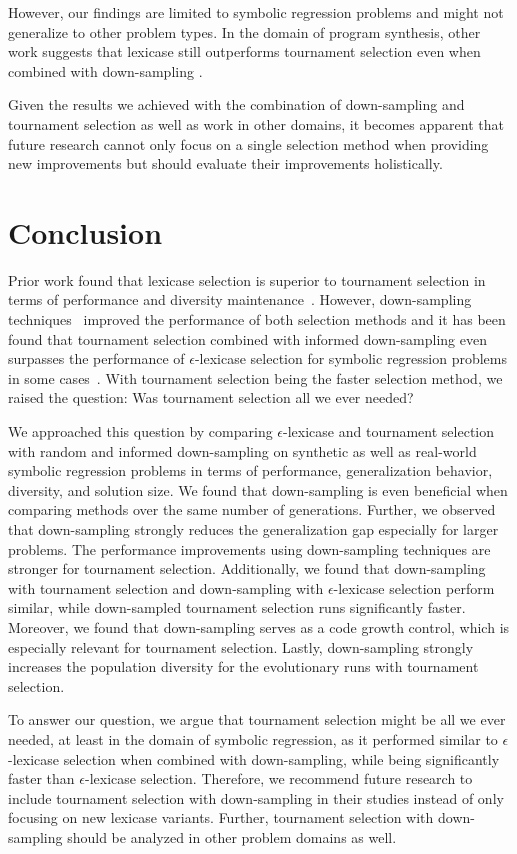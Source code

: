\documentclass[runningheads]{llncs}
\begin{document}
However, our findings are limited to symbolic regression problems and might not generalize to other problem types. In the domain of program synthesis, other work suggests that lexicase still outperforms tournament selection even when combined with down-sampling \cite{boldi2024untangling}.

Given the results we achieved with the combination of down-sampling and tournament selection as well as work in other domains, it becomes apparent that future research cannot only focus on a single selection method when providing new improvements but should evaluate their improvements holistically. 


\section{Conclusion}
\label{sec:conclusion}

Prior work found that lexicase selection is superior to tournament selection in terms of performance and diversity maintenance~\cite{Helmuth.2014,Helmuth.2015, LaCava.2016}. However, down-sampling techniques~\cite{Goncalves.2012,boldi2024informed} improved the performance of both selection methods and it has been found that tournament selection combined with informed down-sampling even surpasses the performance of $\epsilon$-lexicase selection for symbolic regression problems in some cases~\cite{geiger2024lexicase}. With tournament selection being the faster selection method, we raised the question: Was tournament selection all we ever needed?  

We approached this question by comparing $\epsilon$-lexicase and tournament selection with random and informed down-sampling on synthetic as well as real-world symbolic regression problems in terms of performance, generalization behavior, diversity, and solution size. 
We found that down-sampling is even beneficial when comparing methods over the same number of generations. Further, we observed that down-sampling strongly reduces the generalization gap especially for larger problems. The performance improvements using down-sampling techniques are stronger for tournament selection. Additionally, we found that down-sampling with tournament selection and down-sampling with $\epsilon$-lexicase selection perform similar, while down-sampled tournament selection runs significantly faster. Moreover, we found that down-sampling serves as a code growth control, which is especially relevant for tournament selection. Lastly, down-sampling strongly increases the population diversity for the evolutionary runs with tournament selection. 

To answer our question, we argue that tournament selection might be all we ever needed, at least in the domain of symbolic regression, as it performed similar to $\epsilon$-lexicase selection when combined with down-sampling, while being significantly faster than $\epsilon$-lexicase selection. Therefore, we recommend future research to include tournament selection with down-sampling in their studies instead of only focusing on new lexicase variants. Further, tournament selection with down-sampling should be analyzed in other problem domains as well.




\end{document}
